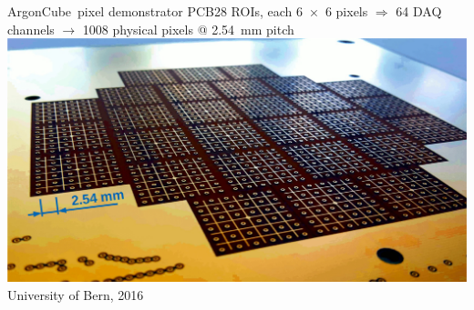 \documentclass[]{beamer}
\newcommand*{\emphcol}{blue}
\newcommand*{\AC}{{ArgonCube}}
\begin{document}
\begin{frame}{\AC\ pixel demonstrator PCB}{\num{28} ROIs, each \num{6 x 6} pixels $\Rightarrow$ {\color{\emphcol} \num{64} DAQ channels $\rightarrow$ \num{1008} physical pixels} @ \SI{2.54}{\milli\meter} pitch}
	\centering
	\includegraphics[height=.75\textheight]{viper/pixies}\\
	{\tiny University of Bern, 2016}\\
\end{frame}
\end{document}
